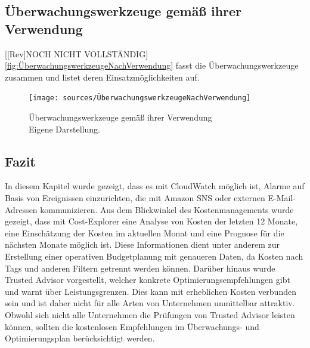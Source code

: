 \newpage
\subsection{Überwachungswerkzeuge gemäß ihrer Verwendung}
[[Rev]NOCH NICHT VOLLSTÄNDIG]
\autoref{fig:ÜberwachungswerkzeugeNachVerwendung} fasst die Überwachungswerkzeuge zusammen und listet deren Einsatzmöglichkeiten auf.
\begin{figure}[h!]
  \centering
  \texttt{[image: sources/ÜberwachungswerkzeugeNachVerwendung]}
  \caption[Überwachungswerkzeuge gemäß ihrer Verwendung]{}
  \label{fig:ÜberwachungswerkzeugeNachVerwendung} 
  Überwachungswerkzeuge gemäß ihrer Verwendung\\
  Eigene Darstellung\cite{AMZ12, AMZ20, AMZ21}. 
\end{figure}


\subsection*{Fazit}
In diesem Kapitel wurde gezeigt, dass es mit CloudWatch möglich ist, Alarme auf Basis von Ereignissen einzurichten, die mit Amazon SNS oder externen E-Mail-Adressen kommunizieren. %
Aus dem Blickwinkel des Kostenmanagements wurde gezeigt, dass mit Cost-Explorer eine Analyse von Kosten der letzten 12 Monate, eine Einschätzung der Kosten im aktuellen Monat und eine Prognose für die nächsten Monate möglich ist. Diese Informationen dient unter anderem zur Erstellung einer operativen Budgetplanung mit genaueren Daten, da
Kosten nach Tags und anderen Filtern getrennt werden können.
Darüber hinaus wurde Trusted Advisor vorgestellt, welcher konkrete Optimierungsempfehlungen gibt und warnt über Leistungsgrenzen. Dies kann mit erheblichen Kosten verbunden sein und ist daher nicht für alle Arten von Unternehmen unmittelbar attraktiv. Obwohl sich nicht alle Unternehmen die Prüfungen von Trusted Advisor leisten können, sollten die kostenlosen Empfehlungen im Überwachungs- und Optimierungsplan berücksichtigt werden.

